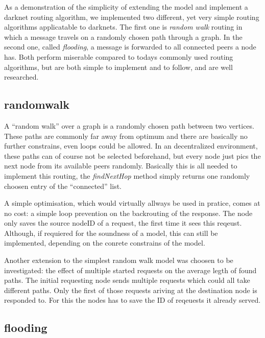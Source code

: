 As a demonstration of the simplicity of extending the model and implement a darknet routing algorithm, we implemented two different, yet very simple routing algorithms applicatable to darknets. The first one is \emph{random walk} routing in which a message travels on a randomly chosen path through a graph. In the second one, called \emph{flooding}, a message is forwarded to all connected peers a node has. Both perform miserable compared to todays commonly used routing algorithms, but are both simple to implement and to follow, and are well researched.

\subsection{randomwalk}

A ``random walk'' over a graph is a randomly chosen path between two vertices. These paths are commonly far away from optimum and there are basically no further constrains, even loops could be allowed. In an decentralized environment, these paths can of course not be selected beforehand, but every node just pics the next node from its available peers randomly. Basically this is all needed to implement this routing, the \emph{findNextHop} method simply returns one randomly choosen entry of the ``connected'' list.

A simple optimisation, which would virtually allways be used in pratice, comes at no cost: a simple loop prevention on the backrouting of the response. The node only saves the source nodeID of a request, the first time it sees this reqeust. Although, if requiered for the soundness of a model, this can still be implemented, depending on the conrete constrains of the model.

Another extension to the simplest random walk model was choosen to be investigated: the effect of multiple started requests on the average legth of found paths. The initial requesting node sends multiple requests which could all take different paths. Only the first of those requests ariving at the destination node is responded to. For this the nodes has to save the ID of reqeuests it already served.

\subsection{flooding}


